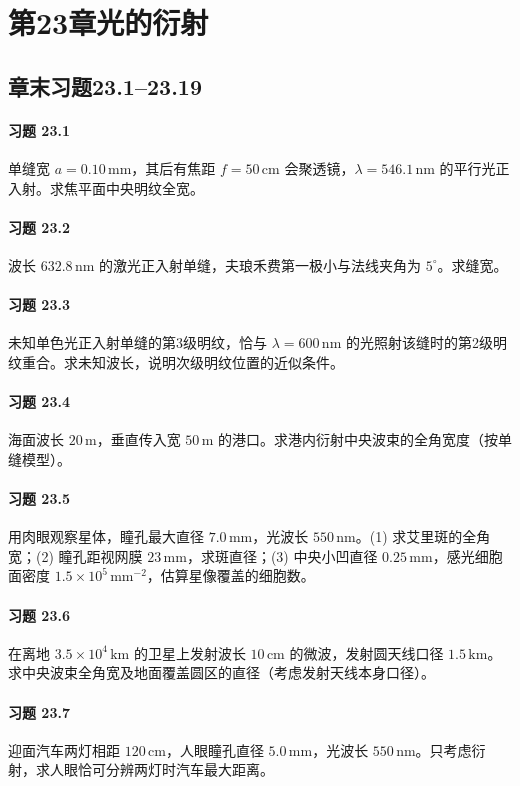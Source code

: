 \section*{第23章\quad 光的衍射}
\subsection*{章末习题23.1--23.19}
\paragraph{习题 23.1}
单缝宽 \(a=0.10\,\mathrm{mm}\)，其后有焦距 \(f=50\,\mathrm{cm}\) 会聚透镜，\(\lambda=546.1\,\mathrm{nm}\) 的平行光正入射。求焦平面中央明纹全宽。
\paragraph{习题 23.2}
波长 \(632.8\,\mathrm{nm}\) 的激光正入射单缝，夫琅禾费第一极小与法线夹角为 \(5^\circ\)。求缝宽。
\paragraph{习题 23.3}
未知单色光正入射单缝的第3级明纹，恰与 \(\lambda=600\,\mathrm{nm}\) 的光照射该缝时的第2级明纹重合。求未知波长，说明次级明纹位置的近似条件。
\paragraph{习题 23.4}
海面波长 \(20\,\mathrm m\)，垂直传入宽 \(50\,\mathrm m\) 的港口。求港内衍射中央波束的全角宽度（按单缝模型）。
\paragraph{习题 23.5}
用肉眼观察星体，瞳孔最大直径 \(7.0\,\mathrm{mm}\)，光波长 \(550\,\mathrm{nm}\)。(1) 求艾里斑的全角宽；(2) 瞳孔距视网膜 \(23\,\mathrm{mm}\)，求斑直径；(3) 中央小凹直径 \(0.25\,\mathrm{mm}\)，感光细胞面密度 \(1.5\times10^5\,\mathrm{mm^{-2}}\)，估算星像覆盖的细胞数。
\paragraph{习题 23.6}
在离地 \(3.5\times10^4\,\mathrm{km}\) 的卫星上发射波长 \(10\,\mathrm{cm}\) 的微波，发射圆天线口径 \(1.5\,\mathrm{km}\)。求中央波束全角宽及地面覆盖圆区的直径（考虑发射天线本身口径）。
\paragraph{习题 23.7}
迎面汽车两灯相距 \(120\,\mathrm{cm}\)，人眼瞳孔直径 \(5.0\,\mathrm{mm}\)，光波长 \(550\,\mathrm{nm}\)。只考虑衍射，求人眼恰可分辨两灯时汽车最大距离。
